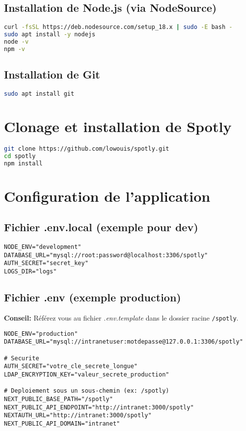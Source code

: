\documentclass[a4paper,12pt]{article}
\begin{document}
\subsection{Installation de Node.js (via NodeSource)}
\begin{lstlisting}[language=bash]
curl -fsSL https://deb.nodesource.com/setup_18.x | sudo -E bash -
sudo apt install -y nodejs
node -v
npm -v
\end{lstlisting}

\subsection{Installation de Git}
\begin{lstlisting}[language=bash]
sudo apt install git
\end{lstlisting}

\section{Clonage et installation de Spotly}
\begin{lstlisting}[language=bash]
git clone https://github.com/lowouis/spotly.git
cd spotly
npm install
\end{lstlisting}

\section{Configuration de l'application}
\subsection{Fichier .env.local (exemple pour dev)}
\begin{lstlisting}
NODE_ENV="development"
DATABASE_URL="mysql://root:password@localhost:3306/spotly"
AUTH_SECRET="secret_key"
LOGS_DIR="logs"
\end{lstlisting}

\subsection{Fichier .env (exemple production)}
\textbf{Conseil:} Référez vous au fichier  \emph{.env.template} dans le dossier racine \texttt{/spotly}.
\newline
\begin{lstlisting}
NODE_ENV="production"
DATABASE_URL="mysql://intranetuser:motdepasse@127.0.0.1:3306/spotly"

# Securite
AUTH_SECRET="votre_cle_secrete_longue"
LDAP_ENCRYPTION_KEY="valeur_secrete_production"

# Deploiement sous un sous-chemin (ex: /spotly)
NEXT_PUBLIC_BASE_PATH="/spotly"
NEXT_PUBLIC_API_ENDPOINT="http://intranet:3000/spotly"
NEXTAUTH_URL="http://intranet:3000/spotly"
NEXT_PUBLIC_API_DOMAIN="intranet"
\end{lstlisting}
\end{document}
